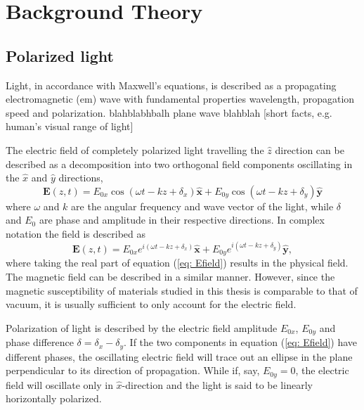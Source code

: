 
\chapter{Background Theory}

\section{Polarized light}
\label{sec:PolarizedLight}
Light, in accordance with Maxwell's equations, is described as a propagating electromagnetic (\ac{em}) wave with fundamental properties wavelength, propagation speed and polarization.  blahblabhbalh plane wave blahblah [short facts, e.g. human's visual range of light]

The electric field of completely polarized light travelling the $\hat{z}$ direction can be described as a decomposition into two orthogonal field components oscillating in the $\hat{x}$ and $\hat{y}$ directions,
\begin{equation}
    \mathbf{E}(z,t) = E_{0x}\cos(\omega t - kz + \delta_x)\mathbf{\hat{x}} + E_{0y}\cos(\omega t - kz + \delta_y)\mathbf{\hat{y}}
    \label{eq:cosEfield}
\end{equation} 
where $\omega$ and $k$ are the angular frequency and wave vector of the light, while $\delta$ and $E_0$ are phase and amplitude in their respective directions. In complex notation the field is described as
\begin{equation}
    \mathbf{E}(z,t) = E_{0x}e^{i(\omega t - kz + \delta_x)}\mathbf{\hat{x}} + E_{0y}e^{i(\omega t - kz + \delta_y)}\mathbf{\hat{y}},
    \label{eq: Efield}
\end{equation}
where taking the real part of equation (\ref{eq: Efield}) results in the physical field. The magnetic field can be described in a similar manner. However, since the magnetic susceptibility of materials studied in this thesis is comparable to that of vacuum, it is usually sufficient to only account for the electric field. 

Polarization of light is described by the electric field amplitude $E_{0x}$, $E_{0y}$ and phase difference $\delta = \delta_x-\delta_y$. If the two components in equation (\ref{eq: Efield}) have different phases, the oscillating electric field will trace out an ellipse in the plane perpendicular to its direction of propagation. While if, say, $E_{0y}=0$, the electric field will oscillate only in $\hat{x}$-direction and the light is said to be linearly horizontally polarized\cite{collett}.

